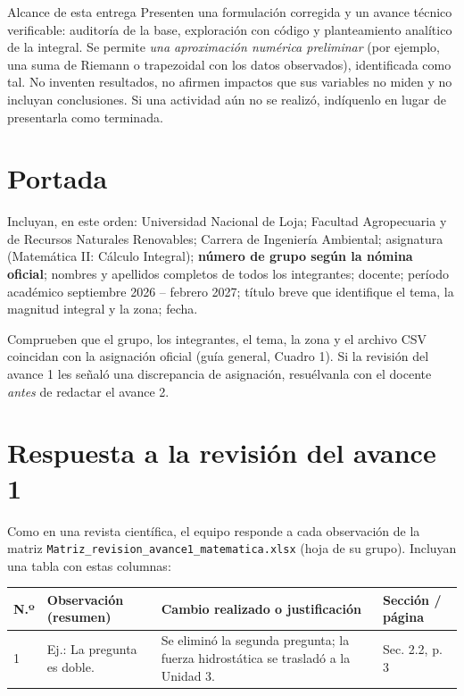 \documentclass[11pt,a4paper]{article}
\begin{document}
\begin{nota}{Alcance de esta entrega}
Presenten una formulación corregida y un avance técnico verificable: auditoría de la base, exploración con código y planteamiento analítico de la integral. Se permite \emph{una aproximación numérica preliminar} (por ejemplo, una suma de Riemann o trapezoidal con los datos observados), identificada como tal. No inventen resultados, no afirmen impactos que sus variables no miden y no incluyan conclusiones. Si una actividad aún no se realizó, indíquenlo en lugar de presentarla como terminada.
\end{nota}

\section*{Portada}
Incluyan, en este orden: Universidad Nacional de Loja; Facultad Agropecuaria y de Recursos Naturales Renovables; Carrera de Ingeniería Ambiental; asignatura (Matemática II: Cálculo Integral); \textbf{número de grupo según la nómina oficial}; nombres y apellidos completos de todos los integrantes; docente; período académico septiembre 2026 -- febrero 2027; título breve que identifique el tema, la magnitud integral y la zona; fecha.

Comprueben que el grupo, los integrantes, el tema, la zona y el archivo CSV coincidan con la asignación oficial (guía general, Cuadro 1). Si la revisión del avance 1 les señaló una discrepancia de asignación, resuélvanla con el docente \emph{antes} de redactar el avance 2.

\section{Respuesta a la revisión del avance 1}

Como en una revista científica, el equipo responde a cada observación de la matriz \texttt{Matriz\_revision\_avance1\_matematica.xlsx} (hoja de su grupo). Incluyan una tabla con estas columnas:

\begin{center}\small
\begin{tabularx}{\linewidth}{L{1.1cm} Y Y L{2.2cm}}
\toprule
\textbf{N.º} & \textbf{Observación (resumen)} & \textbf{Cambio realizado o justificación} & \textbf{Sección / página}\\
 & Ej.: La pregunta es doble. & Se eliminó la segunda pregunta; la fuerza hidrostática se trasladó a la Unidad 3. & Sec. 2.2, p. 3\\
\bottomrule
\end{tabularx}
\end{center}
\end{document}
